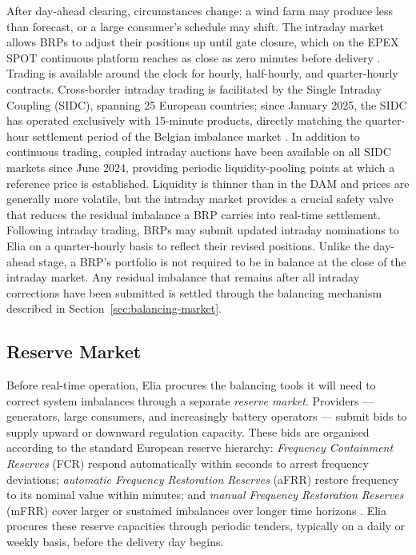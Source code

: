 After day-ahead clearing, circumstances change: a wind farm may produce less than forecast, or a large consumer's schedule may shift. The intraday market allows BRPs to adjust their positions up until gate closure, which on the EPEX SPOT continuous platform reaches as close as zero minutes before delivery \cite{[search: Single Intraday Coupling SIDC cross-border continuous trading XBID gate closure]}. Trading is available around the clock for hourly, half-hourly, and quarter-hourly contracts. Cross-border intraday trading is facilitated by the Single Intraday Coupling (SIDC), spanning 25 European countries; since January 2025, the SIDC has operated exclusively with 15-minute products, directly matching the quarter-hour settlement period of the Belgian imbalance market \cite{[search: Single Intraday Coupling SIDC 15-minute products January 2025 EPEX SPOT]}. In addition to continuous trading, coupled intraday auctions have been available on all SIDC markets since June 2024, providing periodic liquidity-pooling points at which a reference price is established. Liquidity is thinner than in the DAM and prices are generally more volatile, but the intraday market provides a crucial safety valve that reduces the residual imbalance a BRP carries into real-time settlement. Following intraday trading, BRPs may submit updated intraday nominations to Elia on a quarter-hourly basis to reflect their revised positions. Unlike the day-ahead stage, a BRP's portfolio is not required to be in balance at the close of the intraday market. Any residual imbalance that remains after all intraday corrections have been submitted is settled through the balancing mechanism described in Section~\ref{sec:balancing-market}.

\subsection{Reserve Market}
\label{sec:reserve-market}

Before real-time operation, Elia procures the balancing tools it will need to correct system imbalances through a separate \textit{reserve market}. Providers — generators, large consumers, and increasingly battery operators — submit bids to supply upward or downward regulation capacity. These bids are organised according to the standard European reserve hierarchy: \textit{Frequency Containment Reserves} (FCR) respond automatically within seconds to arrest frequency deviations; \textit{automatic Frequency Restoration Reserves} (aFRR) restore frequency to its nominal value within minutes; and \textit{manual Frequency Restoration Reserves} (mFRR) cover larger or sustained imbalances over longer time horizons \cite{[search: Elia Belgium FCR aFRR mFRR reserve products balancing market procurement]}. Elia procures these reserve capacities through periodic tenders, typically on a daily or weekly basis, before the delivery day begins.

